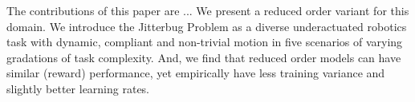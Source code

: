 \documentclass[letterpaper, 10 pt, conference]{ieeeconf}
\begin{document}
The contributions of this paper are ...
We present a reduced order variant for this domain.
We introduce the Jitterbug Problem as a diverse underactuated robotics task with dynamic, compliant and non-trivial motion in five scenarios of varying gradations of task complexity. 
And, we find that reduced order models can have similar (reward) performance, yet empirically have less training variance and slightly better learning rates.








































 







\end{document}

